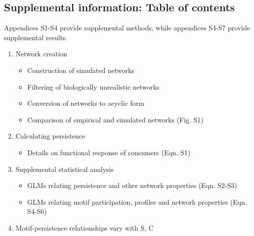 \documentclass[12pt]{article}
\begin{document}
\setlength{\parindent}{15pt} 
\begin{spacing}{2.0}

\clearpage

\section*{Supplemental information: Table of contents}
    {\footnotesize
    \begin{spacing}{1.0}

    Appendices S1-S4 provide supplemental methods, while appendices S4-S7 provide supplemental results.

    \begin{enumerate}
    
        \item Network creation \\
        
            \begin{itemize}
            \item Construction of simulated networks
            \item Filtering of biologically unrealistic networks 
            \item Conversion of networks to acyclic form
            \item Comparison of empirical and simulated networks (Fig. S1)
            \end{itemize}
            
            
        \item Calculating persistence

            \begin{itemize}
                \item Details on functional response of consumers (Eqn. S1)
            \end{itemize}    
            

        \item Supplemental statistical analysis

            \begin{itemize}
                \item GLMs relating persistence and other network properties (Eqn. S2-S3)
                \item GLMs relating motif participation, profiles and network properties (Eqn. S4-S6)
            \end{itemize}
                
        \item Motif-persistence relationships vary with S, C


\end{enumerate}
\end{spacing}}
\end{spacing}
\end{document}
